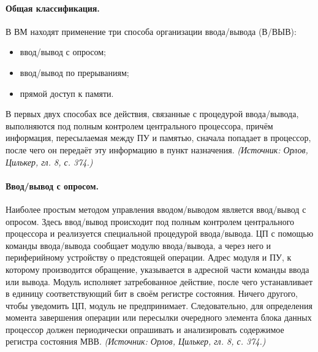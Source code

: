 \documentclass[a4paper,12pt]{article}
\begin{document}
\paragraph{Общая классификация.}
В ВМ находят применение три способа организации ввода/вывода (В/ВЫВ):
\begin{itemize}
\item ввод/вывод с опросом;
\item ввод/вывод по прерываниям;
\item прямой доступ к памяти.
\end{itemize}
В первых двух способах все действия, связанные с процедурой ввода/вывода, выполняются под полным контролем центрального процессора, причём информация, пересылаемая между ПУ и памятью, сначала попадает в процессор, после чего он передаёт эту информацию в пункт назначения.
\textit{(Источник: Орлов, Цилькер, гл. 8, с. 374.)}

\paragraph{Ввод/вывод с опросом.}
Наиболее простым методом управления вводом/выводом является ввод/вывод с опросом. Здесь ввод/вывод происходит под полным контролем центрального процессора и реализуется специальной процедурой ввода/вывода. ЦП с помощью команды ввода/вывода сообщает модулю ввода/вывода, а через него и периферийному устройству о предстоящей операции. Адрес модуля и ПУ, к которому производится обращение, указывается в адресной части команды ввода или вывода. Модуль исполняет затребованное действие, после чего устанавливает в единицу соответствующий бит в своём регистре состояния. Ничего другого, чтобы уведомить ЦП, модуль не предпринимает. Следовательно, для определения момента завершения операции или пересылки очередного элемента блока данных процессор должен периодически опрашивать и анализировать содержимое регистра состояния МВВ.
\textit{(Источник: Орлов, Цилькер, гл. 8, с. 374.)}
\end{document}
